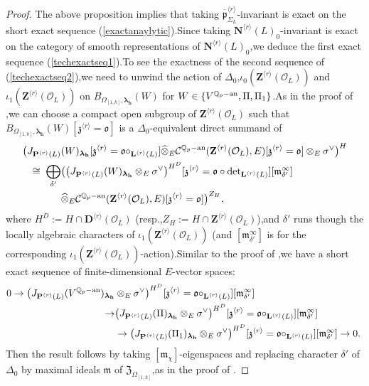 \documentclass[SecEq,CM,GP]{degruyter-crelle} %
\theoremstyle{plain}
\newcommand{\ana}{{\rm an}}
\newcommand{\lrr}{{\langle r\rangle}}
\newcommand{\omepik}{\Omega_{[1,k]}}
\newcommand{\BQ}{{\mathbb{Q}}}
\newcommand{\bD}{{\mathbf{D}}}
\newcommand{\bL}{{\mathbf{L}}}
\newcommand{\bN}{{\mathbf{N}}}
\newcommand{\bP}{{\mathbf{P}}}
\newcommand{\bZ}{{\mathbf{Z}}}
\newcommand{\bh}{{\mathbf{h}}}
\newcommand{\cC}{\mathcal C}
\newcommand{\cO}{\mathcal O}
\newcommand{\fm}{{\mathfrak{m}}}
\newcommand{\fo}{{\mathfrak{o}}}
\newcommand{\fp}{{\mathfrak{p}}}
\newcommand{\fz}{{\mathfrak{z}}}
\begin{document}
\begin{proof}The above proposition implies that taking $\overline{\fp}_{\Sigma_L}^{\lrr}$-invariant is exact on the short exact sequence (\ref{exactanaylytic}).\;Since taking $\bN^{\lrr}(L)_0$-invariant is exact on the category of smooth representations of $\bN^{\lrr}(L)_0$,\;we deduce the first exact sequence (\ref{techexactseq1}).\;To see the exactness of the second sequence of (\ref{techexactseq2}),\;we need to unwind the action of $\Delta_0$,\;$\iota_0(\bZ^{\lrr}(\cO_L))$ and $\iota_1(\bZ^{\lrr}(\cO_L))$ on $B_{\omepik,{\bm\lambda}_\bh}(W)$ for $W\in\{V^{\BQ_p-\ana},\Pi,\Pi_1\}$.\;As in the proof of \cite[Lemma 3.1.4]{Ding2021},\;we can choose a compact open subgroup of  $\bZ^{\lrr}(\cO_L)$ such that $B_{\omepik,{\bm\lambda}_\bh}(W)[\fz^{\lrr}=\fo]$ is a $\Delta_0$-equivalent direct summand of 
\begin{equation*}
	\begin{aligned}
		\big(J_{\bP^{\lrr}(L)}&(W)_{{\bm\lambda}_\bh}[\fz^{\lrr}=\fo\circ_{\bL^{\lrr}(L)}]\widehat{\otimes}_E\cC^{\BQ_p-\ana}(\bZ^{\lrr}(\cO_L),E)[\fz^{\lrr}=\fo]\otimes_E\sigma^\vee\big)^H\\
		\cong\;\bigoplus_{\delta'}&\big(\big(J_{\bP^{\lrr}(L)}(W)_{{\bm\lambda}_\bh}\otimes_E\sigma^\vee\big)^{H^D}[\fz^{\lrr}=\fo\circ\mathrm{det}_{\bL^{\lrr}(L)}][\fm_{\delta'}^\infty]\\&\widehat{\otimes}_E\cC^{\BQ_p-\ana}(\bZ^{\lrr}(\cO_L),E)[\fz^{\lrr}=\fo]\big)^{Z_H},		
	\end{aligned}
\end{equation*}
where $H^D:=H\cap \bD^{\lrr}(\cO_L)$ (resp.,\;$Z_H:=H\cap\bZ^{\lrr}(\cO_L)$),\;and $\delta'$ runs though the locally algebraic characters of $\iota_1(\bZ^{\lrr}(\cO_L))$ (and $[\fm_{\delta'}^\infty]$ is for the corresponding $\iota_1(\bZ^{\lrr}(\cO_L))$-action).\;Similar to the proof of \cite[Proposition 4.1,\;(4.3),\;Pages 10521-10522]{breuil2007first},\;we have a short exact sequence of finite-dimensional $E$-vector spaces:
\begin{equation*}
	\begin{aligned}
		0 \rightarrow \big(J_{\bP^{\lrr}(L)}(V^{\BQ_p-\ana})_{{\bm\lambda}_\bh}&\otimes_E\sigma^\vee\big)^{H^D}[\fz^{\lrr}=\fo\circ_{\bL^{\lrr}(L)}][\fm_{\delta'}^\infty] \\
		\rightarrow& \big(J_{\bP^{\lrr}(L)}(\Pi)_{{\bm\lambda}_\bh}\otimes_E\sigma^\vee\big)^{H^D}[\fz^{\lrr}=\fo\circ_{\bL^{\lrr}(L)}][\fm_{\delta'}^\infty]\\ & \rightarrow \big(J_{\bP^{\lrr}(L)}(\Pi_1)_{{\bm\lambda}_\bh}\otimes_E\sigma^\vee\big)^{H^D}[\fz^{\lrr}=\fo\circ_{\bL^{\lrr}(L)}][\fm_{\delta'}^\infty] \rightarrow 0.\;
	\end{aligned}
\end{equation*}
Then the result follows by taking $[\fm_\chi]$-eigenspaces and replacing character $\delta'$ of $\Delta_0$ by maximal ideals $\fm$ of $\mathfrak{Z}_{\omepik}$,\;as in the proof of \cite[Lemma 3.1.4]{Ding2021}.\;
\end{proof}
\end{document}
